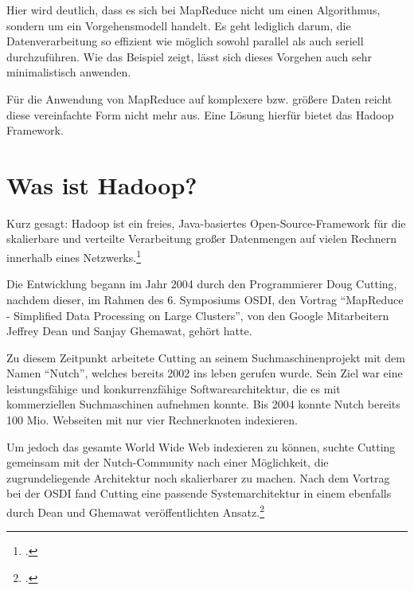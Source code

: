 Hier wird deutlich, dass es sich bei MapReduce nicht um einen Algorithmus, sondern um ein Vorgehensmodell handelt. Es geht lediglich darum, die Datenverarbeitung so effizient wie möglich sowohl parallel als auch seriell durchzuführen. Wie das Beispiel zeigt, lässt sich dieses Vorgehen auch sehr minimalistisch anwenden.

Für die Anwendung von MapReduce auf komplexere bzw. größere Daten reicht diese vereinfachte Form nicht mehr aus. Eine Lösung hierfür bietet das Hadoop Framework.



\section{Was ist Hadoop?}\label{sec:WasIstHadoop}
\flqq Kurz gesagt: Hadoop ist ein freies, Java-basiertes Open-Source-Framework für die skalierbare und verteilte Verarbeitung großer Datenmengen auf vielen Rechnern innerhalb eines Netzwerks.\frqq\footcite[S. 21]{Wartala.2012}

Die Entwicklung begann im Jahr 2004 durch den Programmierer Doug Cutting, nachdem dieser, im Rahmen des 6. Symposiums \ac{OSDI}, den Vortrag "`MapReduce - Simplified Data Processing on Large Clusters"', von den Google Mitarbeitern Jeffrey Dean und Sanjay Ghemawat, gehört hatte.

Zu diesem Zeitpunkt arbeitete Cutting an seinem Suchmaschinenprojekt mit dem Namen "`Nutch"', welches bereits 2002 ins leben gerufen wurde. Sein Ziel war eine leistungsfähige und konkurrenzfähige Softwarearchitektur, die es mit kommerziellen Suchmaschinen aufnehmen konnte. Bis 2004 konnte Nutch bereits 100 Mio. Webseiten mit nur vier Rechnerknoten indexieren.

Um jedoch das gesamte World Wide Web indexieren zu können, suchte Cutting gemeinsam mit der Nutch-Community nach einer Möglichkeit, die zugrundeliegende Architektur noch skalierbarer zu machen. Nach dem Vortrag bei der \ac{OSDI} fand Cutting eine passende Systemarchitektur in einem ebenfalls durch Dean und Ghemawat veröffentlichten Ansatz.\footcite[Näheres siehe][]{Dean.2004}

